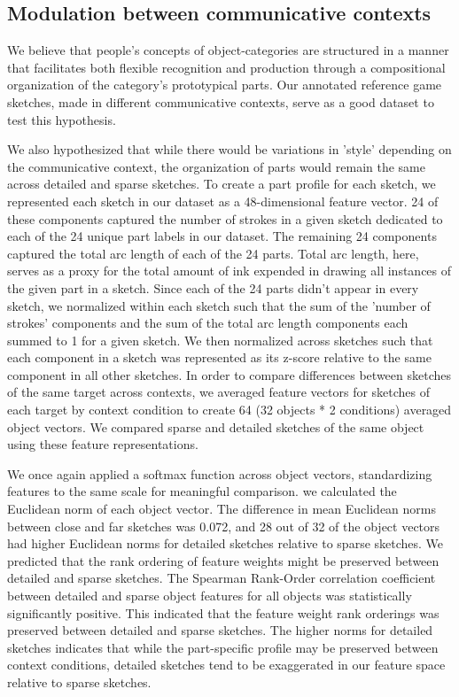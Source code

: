 \documentclass[10pt,letterpaper]{article}
\begin{document}
\subsection{Modulation between communicative contexts}





We believe that people's concepts of object-categories are structured in a manner that facilitates both flexible recognition and production through a compositional organization of the category's prototypical parts. Our annotated reference game sketches, made in different communicative contexts, serve as a good dataset to test this hypothesis.

We also hypothesized that while there would be variations in 'style' depending on the communicative context, the organization of parts would remain the same across detailed and sparse sketches. To create a part profile for each sketch, we represented each sketch in our dataset as a 48-dimensional feature vector. 
24 of these components captured the number of strokes in a given sketch dedicated to each of the 24 unique part labels in our dataset. The remaining 24 components captured the total arc length of each of the 24 parts. Total arc length, here, serves as a proxy for the total amount of ink expended in drawing all instances of the given part in a sketch. Since each of the 24 parts didn't appear in every sketch, we normalized within each sketch such that the sum of the 'number of strokes' components and the sum of the total arc length components each summed to 1 for a given sketch. We then normalized across sketches such that each component in a sketch was represented as its z-score relative to the same component in all other sketches. 
In order to compare differences between sketches of the same target across contexts, we averaged feature vectors for sketches of each target by context condition to create 64 (32 objects * 2 conditions) averaged object vectors.
We compared sparse and detailed sketches of the same object using these feature representations. 



We once again applied a softmax function across object vectors, standardizing features to the same scale for meaningful comparison.
we calculated the Euclidean norm of each object vector. The difference in mean Euclidean norms between close and far sketches was 0.072, and 28 out of 32 of the object vectors had higher Euclidean norms for detailed sketches relative to sparse sketches. We predicted that the rank ordering of feature weights might be preserved between detailed and sparse sketches. The Spearman Rank-Order correlation coefficient between detailed and sparse object features for all objects was statistically significantly positive. This indicated that the feature weight rank orderings was preserved between detailed and sparse sketches. The higher norms for detailed sketches indicates that while the part-specific profile may be preserved between context conditions, detailed sketches tend to be exaggerated in our feature space relative to sparse sketches.
\end{document}
